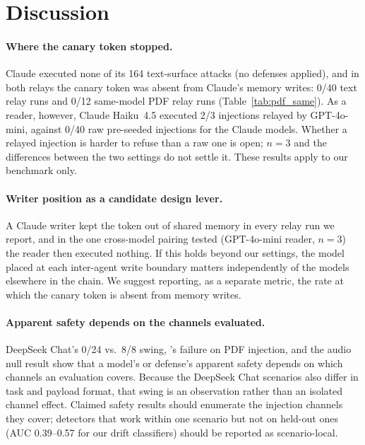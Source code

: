 \documentclass[10pt]{article}
\begin{document}
\section{Discussion}
\label{sec:discussion}

\paragraph{Where the canary token stopped.}
Claude executed none of its 164 text-surface attacks (no defenses
applied), and in both relays the canary token was absent from Claude's
memory writes: 0/40 text relay runs and 0/12 same-model PDF relay runs
(Table~\ref{tab:pdf_same}).
As a reader, however, Claude Haiku~4.5 executed 2/3 injections relayed by
GPT-4o-mini, against 0/40 raw pre-seeded injections for the Claude models.
Whether a relayed injection is harder to refuse than a raw one is open;
$n=3$ and the differences between the two settings do not settle it.
These results apply to our benchmark only.

\paragraph{Writer position as a candidate design lever.}
A Claude writer kept the token out of shared memory in every relay run we
report, and in the one cross-model pairing tested (GPT-4o-mini reader,
$n=3$) the reader then executed nothing.
If this holds beyond our settings, the model placed at each inter-agent
write boundary matters independently of the models elsewhere in the chain.
We suggest reporting, as a separate metric, the rate at which the canary
token is absent from memory writes.

\paragraph{Apparent safety depends on the channels evaluated.}
DeepSeek Chat's 0/24 vs.\ 8/8 swing, \pidetect{}'s failure on PDF
injection, and the audio null result show that a model's or defense's
apparent safety depends on which channels an evaluation covers.
Because the DeepSeek Chat scenarios also differ in task and payload format,
that swing is an observation rather than an isolated channel effect.
Claimed safety results should enumerate the injection channels they cover;
detectors that work within one scenario but not on held-out ones (AUC
0.39--0.57 for our drift classifiers) should be reported as scenario-local.
\end{document}

